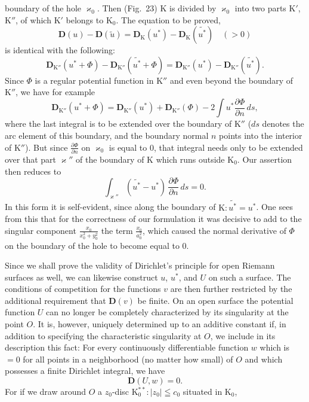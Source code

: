\documentclass{article}
\begin{document}
boundary of the hole $\varkappa_0$. Then (Fig.~23) $\mathrm{K}$ is divided by $\varkappa_0$ into two parts $\mathrm{K}'$, $\mathrm{K}''$, of which $\mathrm{K}'$ belongs to $\mathrm{K}_0$. The equation to be proved,
\[ \mathbf{D}(u) - \mathbf{D}(\tilde{u}) = \mathbf{D}_{\mathrm{K}}(u^*) - \mathbf{D}_{\mathrm{K}}(\widetilde{u^*}) \quad (> 0) \]
is identical with the following:
\[ \mathbf{D}_{\mathrm{K}''}(u^* + \Phi) - \mathbf{D}_{\mathrm{K}''}(\widetilde{u^*} + \Phi) = \mathbf{D}_{\mathrm{K}''}(u^*) - \mathbf{D}_{\mathrm{K}''}(\widetilde{u^*}). \tag{28} \]
Since $\Phi$ is a regular potential function in $\mathrm{K}''$ and even beyond the boundary of $\mathrm{K}''$, we have for example
\[ \mathbf{D}_{\mathrm{K}''}(u^* + \Phi) = \mathbf{D}_{\mathrm{K}''}(u^*) + \mathbf{D}_{\mathrm{K}''}(\Phi) - 2 \int u^* \frac{\partial\Phi}{\partial n}\,ds, \]
where the last integral is to be extended over the boundary of $\mathrm{K}''$ ($ds$ denotes the arc element of this boundary, and the boundary normal $n$ points into the interior of $\mathrm{K}''$). But since $\frac{\partial\Phi}{\partial n}$ on $\varkappa_0$ is equal to $0$, that integral needs only to be extended over that part $\varkappa''$ of the boundary of $\mathrm{K}$ which runs outside $\mathrm{K}_0$. Our assertion then reduces to
\[ \int_{\varkappa''} (\widetilde{u^*} - u^*)\,\frac{\partial\Phi}{\partial n}\,ds = 0. \]
In this form it is self-evident, since along the boundary of $\mathrm{K}\colon \widetilde{u^*} = u^*$. One sees from this that for the correctness of our formulation it was decisive to add to the singular component $\frac{x_0}{x_0^2 + y_0^2}$ the term $\frac{x_0}{a_0^2}$, which caused the normal derivative of $\Phi$ on the boundary of the hole to become equal to $0$.

Since we shall prove the validity of Dirichlet's principle for open Riemann surfaces as well, we can likewise construct $u$, $u^*$, and $U$ on such a surface. The conditions of competition for the functions $v$ are then further restricted by the additional requirement that $\mathbf{D}(v)$ be finite. On an open surface the potential function $U$ can no longer be completely characterized by its singularity at the point $O$. It is, however, uniquely determined up to an additive constant if, in addition to specifying the characteristic singularity at $O$, we include in its description this fact: For every continuously differentiable function $w$ which is $= 0$ for all points in a neighborhood (no matter how small) of $O$ and which possesses a finite Dirichlet integral, we have
\[ \mathbf{D}(U, w) = 0. \]
For if we draw around $O$ a $z_0$-disc $\mathrm{K}_0^{**}\colon |z_0| \leqq c_0$ situated in $\mathrm{K}_0$,
\end{document}
